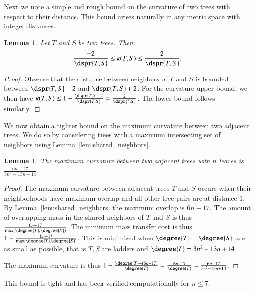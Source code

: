 \documentclass[]{elsarticle}
\newtheorem{lem}[thm]{Lemma}
\newcommand{\curvature}[2][]{%
    \ifthenelse{\equal{#1}{}}%
		{\kappa(#2)}%
		{\kappa_{#1}(#2)}%
}
\begin{document}
Next we note a simple and rough bound on the curvature of two trees with respect to their distance.
This bound arises naturally in any metric space with integer distances.


\begin{lem}
	\label{lem:curvature_distance_bound}
	Let $T$ and $S$ be two trees. Then:
	$$ \frac{-2}{\dspr{T,S}} \le \curvature{T,S} \le \frac{2}{\dspr{T,S}} .$$
\end{lem}
\begin{proof}
	Observe that the distance between neighbors of $T$ and $S$ is bounded between $\dspr{T,S} - 2$ and $\dspr{T,S} + 2$.
	For the curvature upper bound, we then have $\curvature{T,S} \le 1 - \frac{\dspr{T,S} - 2}{\dspr{T,S}} = \frac{2}{\dspr{T,S}}$.
	The lower bound follows similarly.
\end{proof}

We now obtain a tighter bound on the maximum curvature between two adjacent trees.
We do so by considering trees with a maximum intersecting set of neighbors using Lemma~\ref{lem:shared_neighbors}.

\begin{lem}
	\label{lem:max_adjacent_curvature}
	The maximum curvature between two adjacent trees with $n$ leaves is $\frac{6n-17}{3n^2-13n+14}$.
\end{lem}
\begin{proof}
The maximum curvature between adjacent trees $T$ and $S$ occurs when their neighborhoods have maximum overlap and all other tree pairs are at distance 1.
By Lemma~\ref{lem:shared_neighbors} the maximum overlap is $6n-17$.
The amount of overlapping mass in the shared neighbors of $T$ and $S$ is thus $\frac{6n-17}{\max(\degree{T},\degree{S})}$.
The minimum mass transfer cost is thus $1 - \frac{6n-17}{\max(\degree{T},\degree{S})}$.
This is minimized when $\degree{T}=\degree{S}$ are as small as possible, that is $T,S$ are ladders and $\degree{T} = 3n^2 - 13n + 14$.

The maximum curvature is thus $1 - \frac{\degree{T} - (6n-17)}{\degree{T}} = \frac{6n - 17}{\degree{T}}= \frac{6n-17}{3n^2-13n+14}$.
\end{proof}

This bound is tight and has been verified computationally for $n \le 7$.
\end{document}
